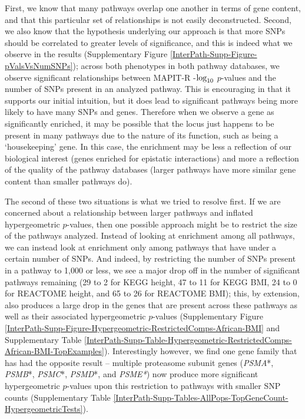 \documentclass[12pt,a4paper]{article}
\def\log{{\rm log}}
\begin{document}
First, we know that many pathways overlap one another in terms of gene content, and that this particular set of relationships is not easily deconstructed. Second, we also know that the hypothesis underlying our approach is that more SNPs should be correlated to greater levels of significance, and this is indeed what we observe in the results (Supplementary Figure \ref{InterPath-Supp-Figure-pValsVsNumSNPs}); across both phenotypes in both pathway databases, we observe significant relationships between MAPIT-R -$\log_{10}$ $p$-values and the number of SNPs present in an analyzed pathway. This is encouraging in that it supports our initial intuition, but it does lead to significant pathways being more likely to have many SNPs and genes. Therefore when we observe a gene as significantly enriched, it may be possible that the locus just happens to be present in many pathways due to the nature of its function, such as being a `housekeeping' gene. In this case, the enrichment may be less a reflection of our biological interest (genes enriched for epistatic interactions) and more a reflection of the quality of the pathway databases (larger pathways have more similar gene content than smaller pathways do).

The second of these two situations is what we tried to resolve first. If we are concerned about a relationship between larger pathways and inflated hypergeometric $p$-values, then one possible approach might be to restrict the size of the pathways analyzed. Instead of looking at enrichment among all pathways, we can instead look at enrichment only among pathways that have under a certain number of SNPs. And indeed, by restricting the number of SNPs present in a pathway to 1,000 or less, we see a major drop off in the number of significant pathways remaining (29 to 2 for KEGG height, 47 to 11 for KEGG BMI, 24 to 0 for REACTOME height, and 65 to 26 for REACTOME BMI); this, by extension, also produces a large drop in the genes that are present across these pathways as well as their associated hypergeometric $p$-values (Supplementary Figure \ref{InterPath-Supp-Figure-Hypergeometric-RestrictedComps-African-BMI} and Supplementary Table \ref{InterPath-Supp-Table-Hypergeometric-RestrictedComps-African-BMI-TopExamples}). Interestingly however, we find one gene family that has had the opposite result -- multiple proteasome subunit genes (\textit{PSMA}*, \textit{PSMB}*, \textit{PSMC}*, \textit{PSMD}*, and \textit{PSME*}) now produce more significant hypergeometric $p$-values upon this restriction to pathways with smaller SNP counts (Supplementary Table \ref{InterPath-Supp-Tables-AllPops-TopGeneCount-HypergeometricTests}). 
\end{document}
